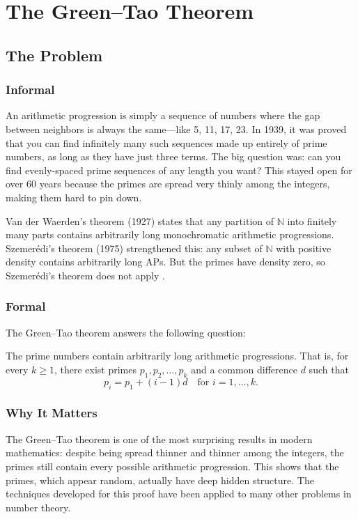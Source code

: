 \let\LocalMacro\relax

\chapter{The Green--Tao Theorem}

\section{The Problem}

\subsection{Informal}
An arithmetic progression is simply a sequence of numbers where the gap between neighbors is always the same---like 5, 11, 17, 23. In 1939, it was proved that you can find infinitely many such sequences made up entirely of prime numbers, as long as they have just three terms. The big question was: can you find evenly-spaced prime sequences of any length you want? This stayed open for over 60 years because the primes are spread very thinly among the integers, making them hard to pin down.

\begin{historicalbox}
Van der Waerden's theorem (1927) states that any partition of $\mathbb{N}$ into finitely many parts contains arbitrarily long monochromatic arithmetic progressions. Szemer\'edi's theorem (1975) strengthened this: any subset of $\mathbb{N}$ with positive density contains arbitrarily long APs. But the primes have density zero, so Szemer\'edi's theorem does not apply \cite{vdW1927, szemeredi1975}.
\end{historicalbox}

\subsection{Formal}

The Green--Tao theorem answers the following question:
\begin{theorem}
The prime numbers contain arbitrarily long arithmetic progressions. That is, for every $k \geq 1$, there exist primes $p_1, p_2, \ldots, p_k$ and a common difference $d$ such that
\[
p_i = p_1 + (i-1)d \quad \text{for } i = 1, \ldots, k.
\]
\end{theorem}

\subsection{Why It Matters}
The Green--Tao theorem is one of the most surprising results in modern mathematics: despite being spread thinner and thinner among the integers, the primes still contain every possible arithmetic progression. This shows that the primes, which appear random, actually have deep hidden structure. The techniques developed for this proof have been applied to many other problems in number theory.


